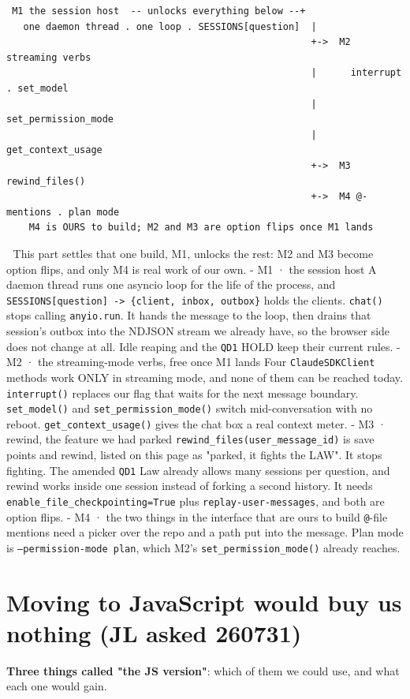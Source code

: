 \begin{verbatim}
 M1 the session host  -- unlocks everything below --+
   one daemon thread . one loop . SESSIONS[question]  |
                                                      +->  M2 streaming verbs
                                                      |      interrupt . set_model
                                                      |      set_permission_mode
                                                      |      get_context_usage
                                                      +->  M3 rewind_files()
                                                      +->  M4 @-mentions . plan mode
    M4 is OURS to build; M2 and M3 are option flips once M1 lands
\end{verbatim}
📌 This part settles that one build, M1, unlocks the rest: M2 and M3 become option flips, and only M4 is real work of our own. - M1 · the session host A daemon thread runs one asyncio loop for the life of the process, and \texttt{SESSIONS[question] -> \{client, inbox, outbox\}} holds the clients. \texttt{chat()} stops calling \texttt{anyio.run}. It hands the message to the loop, then drains that session's outbox into the NDJSON stream we already have, so the browser side does not change at all. Idle reaping and the \texttt{QD1} HOLD keep their current rules. - M2 · the streaming-mode verbs, free once M1 lands Four \texttt{ClaudeSDKClient} methods work ONLY in streaming mode, and none of them can be reached today. \texttt{interrupt()} replaces our flag that waits for the next message boundary. \texttt{set\_model()} and \texttt{set\_permission\_mode()} switch mid-conversation with no reboot. \texttt{get\_context\_usage()} gives the chat box a real context meter. - M3 · rewind, the feature we had parked \texttt{rewind\_files(user\_message\_id)} is save points and rewind, listed on this page as "parked, it fights the LAW". It stops fighting. The amended \texttt{QD1} Law already allows many sessions per question, and rewind works inside one session instead of forking a second history. It needs \texttt{enable\_file\_checkpointing=True} plus \texttt{replay-user-messages}, and both are option flips. - M4 · the two things in the interface that are ours to build \texttt{@}-file mentions need a picker over the repo and a path put into the message. Plan mode is \texttt{--permission-mode plan}, which M2's \texttt{set\_permission\_mode()} already reaches.


\section{Moving to JavaScript would buy us nothing (JL asked 260731)}
\textbf{Three things called "the JS version"}: which of them we could use, and what each one would gain.

